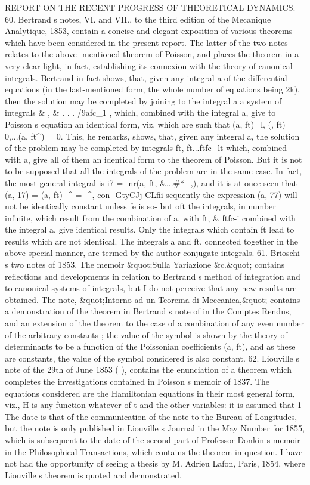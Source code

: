 \documentclass[11pt,a4paper]{book}
\begin{document}

REPORT ON THE RECENT PROGRESS
OF THEORETICAL DYNAMICS.
60.
Bertrand s
notes,
VI. and
VII.,
to the
third
edition of the Mecanique Analytique,
1853,
contain
a
concise
and
elegant
exposition
of
various
theorems
which
have
been
considered
in
the
present
report.
The
latter
of
the
two
notes
relates
to
the
above-
mentioned
theorem
of
Poisson, and
places
the
theorem
in
a
very
clear
light,
in
fact,
establishing
its
connexion
with
the
theory
of
canonical
integrals.
Bertrand
in
fact
shows,
that,
given
any
integral
a
of
the
differential
equations
(in
the
last-mentioned
form,
the
whole
number
of
equations
being
2k),
then
the
solution may
be
completed
by
joining
to
the
integral
a
a
system
of
integrals \&
, \&
.
.
.
/9afc_1
,
which,
combined
with
the
integral
a, give
to
Poisson s
equation
an
identical
form,
viz. which
are
such
that
(a, ft)=l, (,
ft) = 0,...(a, ft^) = 0.
This,
he
remarks,
shows,
that, given
any
integral
a,
the
solution
of
the
problem may
be
completed
by
integrals
ft,
ft...ftfc_lt
which,
combined
with
a,
give
all
of
them
an
identical
form
to
the
theorem
of
Poisson.
But
it
is
not
to
be
supposed
that
all
the
integrals
of
the
problem
are
in
the same
case.
In
fact,
the most general
integral
is
i7 = -nr(a,
ft,
\&...\#*_,),
and
it
is
at
once
seen
that
(a,
17) = (a, ft) -^ = -^, con-
GtyCJj
CLfii
sequently
the
expression
(a,
77)
will
not
be
identically
constant
unless fe
is
so-
but
oft
the
integrals,
in
number
infinite,
which
result
from
the
combination
of
a,
with
ft, \&
ftfc-i
combined
with
the
integral
a,
give
identical
results.
Only
the
integrals
which
contain
ft
lead
to
results
which
are
not
identical.
The
integrals
a
and
ft,
connected
together
in
the
above
special
manner,
are
termed
by the
author
conjugate
integrals.
61.
Brioschi s
two
notes
of
1853.
The
memoir
\&quot;Sulla
Yariazione
\&c.\&quot;
contains
reflections
and
developments
in
relation
to
Bertrand s
method
of
integration
and
to
canonical systems of integrals, but
I do not perceive that any new
results are
obtained.
The
note,
\&quot;Intorno
ad
un
Teorema
di
Meccanica,\&quot;
contains
a
demonstration
of
the
theorem
in
Bertrand s
note
of
in
the
Comptes
Rendus,
and an
extension
of
the
theorem
to the
case
of a combination
of any even number of the arbitrary constants
;
the
value
of
the
symbol
is
shown
by
the
theory
of determinants
to
be
a
function
of
the
Poissonian
coefficients
(a,
ft), and
as
these
are
constants,
the
value
of
the
symbol
considered
is
also
constant.
62.
Liouville s
note
of
the
29th
of
June
1853 (
),
contains
the
enunciation
of a
theorem
which
completes
the
investigations
contained
in
Poisson s
memoir
of
1837.
The
equations
considered
are
the
Hamiltonian
equations
in
their
most
general
form,
viz., H
is
any
function
whatever
of
t
and
the
other
variables:
it
is
assumed
that
1 The
date
is
that of
the communication
of
the
note
to the Bureau
of Longitudes, but the note
is
only
published
in
Liouville s
Journal
in
the
May
Number
for
1855,
which
is
subsequent
to
the
date
of
the
second
part
of
Professor Donkin s
memoir
in
the
Philosophical
Transactions,
which
contains
the theorem
in
question.
I
have
not
had
the
opportunity
of
seeing
a
thesis
by
M.
Adrieu
Lafon,
Paris,
1854,
where
Liouville s theorem
is quoted and demonstrated.
\end{document}
